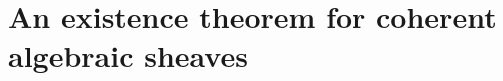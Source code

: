 \section{An existence theorem for coherent algebraic sheaves}
\label{section:an-existence-theorem-for-coherent-algebraic-sheaves}


